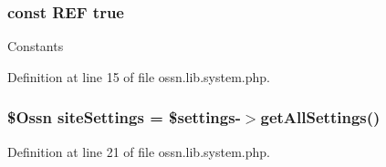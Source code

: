 \subsubsection[{\texorpdfstring{R\+EF}{REF}}]{\setlength{\rightskip}{0pt plus 5cm}const R\+EF true}\hypertarget{ossn_8lib_8system_8php_a6141904c50990cdd468f07046f29bb5c}{}\label{ossn_8lib_8system_8php_a6141904c50990cdd468f07046f29bb5c}
Constants 

Definition at line 15 of file ossn.\+lib.\+system.\+php.

\subsubsection[{\texorpdfstring{site\+Settings}{siteSettings}}]{\setlength{\rightskip}{0pt plus 5cm}\$Ossn site\+Settings = \$settings-\/$>$get\+All\+Settings()}\hypertarget{ossn_8lib_8system_8php_a4fa0e9ed8e9f90f5c0e8a852d868a8eb}{}\label{ossn_8lib_8system_8php_a4fa0e9ed8e9f90f5c0e8a852d868a8eb}


Definition at line 21 of file ossn.\+lib.\+system.\+php.

